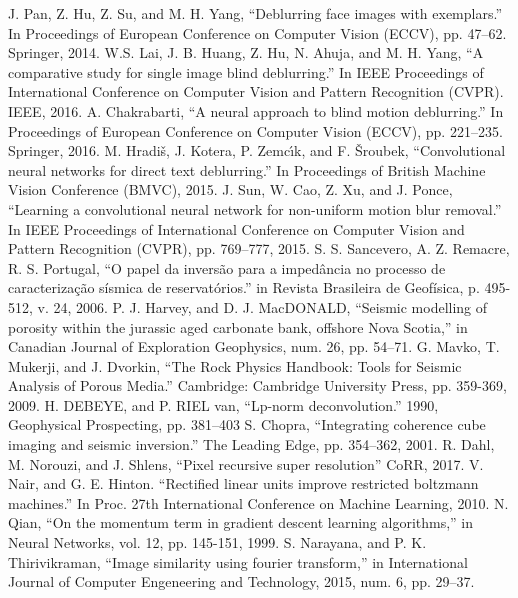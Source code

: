 \documentclass[conference]{IEEEtran}
\begin{document}
\begin{thebibliography}{00}
		J. Pan, Z. Hu, Z. Su, and M. H. Yang, ``Deblurring face images with exemplars.'' In Proceedings of European Conference on Computer Vision (ECCV), pp. 47–62. Springer, 2014.
		W.S. Lai, J. B. Huang, Z. Hu, N. Ahuja, and M. H. Yang, ``A comparative study for single image blind deblurring.'' In IEEE Proceedings of International Conference on Computer Vision and Pattern Recognition (CVPR). IEEE, 2016.
	A. Chakrabarti, ``A neural approach to blind motion deblurring.'' In Proceedings of European Conference on Computer Vision (ECCV), pp. 221–235. Springer, 2016.
		M. Hradiš, J. Kotera, P. Zemcı́k, and F. Šroubek, ``Convolutional neural networks for direct text deblurring.'' In Proceedings of British Machine Vision Conference (BMVC), 2015.
		J. Sun, W. Cao, Z. Xu, and J. Ponce, ``Learning a convolutional neural network for non-uniform motion blur removal.'' In IEEE Proceedings of International Conference on Computer Vision and Pattern Recognition (CVPR), pp. 769–777, 2015.
		S. S. Sancevero, A. Z. Remacre, R. S. Portugal, ``O papel da inversão para a impedância no processo de caracterização sísmica de reservatórios.'' in Revista Brasileira de Geofísica, p. 495-512, v. 24, 2006.
 		P. J. Harvey, and D. J. MacDONALD, ``Seismic modelling of porosity within the jurassic aged carbonate bank, offshore Nova Scotia,'' in  Canadian Journal of Exploration Geophysics, num. 26, pp. 54–71.
		G. Mavko, T. Mukerji, and J. Dvorkin, ``The Rock Physics Handbook: Tools for Seismic Analysis of Porous Media.'' Cambridge: Cambridge University Press, pp. 359-369, 2009.
		H. DEBEYE, and P. RIEL van, ``Lp-norm deconvolution.'' 1990, Geophysical Prospecting, pp. 381–403
		S. Chopra, ``Integrating coherence cube imaging and seismic inversion.'' The Leading Edge, pp. 354–362, 2001.
		R. Dahl, M. Norouzi, and J. Shlens, ``Pixel recursive super resolution'' CoRR, 2017.
 		V. Nair, and G. E. Hinton. ``Rectified linear units improve restricted boltzmann machines.'' In Proc. 27th International Conference on Machine Learning, 2010.
		N. Qian, ``On the momentum term in gradient descent learning algorithms,'' in Neural Networks, vol. 12, pp. 145-151, 1999.
		S. Narayana, and P. K. Thirivikraman, ``Image similarity using fourier transform,'' in International Journal of Computer Engeneering and Technology, 2015, num. 6, pp. 29–37.

\end{thebibliography}
\end{document}
